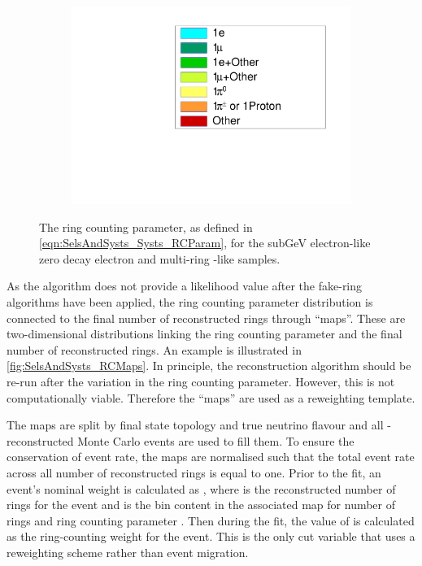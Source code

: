 \begin{figure}[h]
\begin{subfigure}[t]{0.49\textwidth}
    \includegraphics[width=\textwidth, trim={0mm 0mm 0mm 0mm}, clip,page=1]{Figures/Selections/RCParameterLegend.pdf}
  \end{subfigure}
  \caption{The ring counting parameter, as defined in \autoref{eqn:SelsAndSysts_Systs_RCParam}, for the subGeV electron-like zero decay electron and multi-ring -like samples.}
  \label{fig:SelsAndSysts_RCParameterDistribution}
\end{figure}

As the \fq algorithm does not provide a likelihood value after the fake-ring algorithms have been applied, the ring counting parameter distribution is connected to the final number of reconstructed rings through ``maps''. These are two-dimensional distributions linking the ring counting parameter and the final number of reconstructed rings. An example is illustrated in \autoref{fig:SelsAndSysts_RCMaps}. In principle, the \fq reconstruction algorithm should be re-run after the variation in the ring counting parameter. However, this is not computationally viable. Therefore the ``maps'' are used as a reweighting template.

The maps are split by final state topology and true neutrino flavour and all \fq-reconstructed Monte Carlo events are used to fill them. To ensure the conservation of event rate, the maps are normalised such that the total event rate across all number of reconstructed rings is equal to one. Prior to the fit, an event's nominal weight is calculated as , where  is the reconstructed number of rings for the  event and  is the bin content in the associated map for  number of rings and ring counting parameter . Then during the fit, the value of  is calculated as the ring-counting weight for the  event. This is the only cut variable that uses a reweighting scheme rather than event migration.


